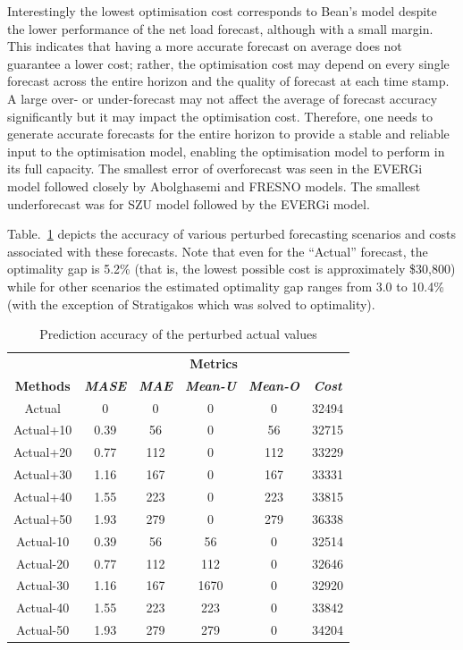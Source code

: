 \documentclass[conference]{IEEEtran}
\begin{document}
Interestingly the lowest optimisation cost corresponds to Bean's model despite the lower performance of the net load forecast, although with a small margin. This indicates that having a more accurate forecast on average does not guarantee a lower cost; rather, the optimisation cost may depend on every single forecast across the entire horizon and the quality of forecast at each time stamp. A large over- or under-forecast may not affect the average of forecast accuracy significantly but it may impact the optimisation cost. Therefore, one needs to generate accurate forecasts for the entire horizon to provide a stable and reliable input to the optimisation model, enabling the optimisation model to perform in its full capacity. The smallest error of overforecast was seen in the EVERGi model followed closely by Abolghasemi and FRESNO models. The smallest underforecast was for SZU model followed by the EVERGi model. 


Table.~\ref{tab:accPurt} depicts the accuracy of various perturbed forecasting scenarios and costs associated with these forecasts. Note that even for the ``Actual'' forecast, the optimality gap is 5.2\% (that is, the lowest possible cost is approximately \$30,800) while for other scenarios the estimated optimality gap ranges from 3.0 to 10.4\% (with the exception of Stratigakos which was solved to optimality).

\begin{table}[htbp]
\caption{Prediction accuracy of the perturbed actual values}
\begin{center}
\begin{tabular}{|c|c|c|c|c|c|}
\hline
\textbf{}&\multicolumn{5}{|c|}{\textbf{Metrics}} \\
\cline{2-6} 
\textbf{Methods} & \textbf{\textit{MASE}}& \textbf{\textit{MAE}}& \textbf{\textit{Mean-U}}& \textbf{\textit{Mean-O}}& \textbf{\textit{Cost}} \\
\hline
Actual & 0 & 0 & 0 & 0& 32494\\
Actual+10 & 0.39 & 56 & 0& 56  &32715 \\
Actual+20 & 0.77 &112 & 0& 112 &33229\\
Actual+30 & 1.16 &167  & 0& 167  &33331  \\
Actual+40 & 1.55 &223 & 0& 223  &33815 \\
Actual+50 & 1.93 & 279& 0 & 279 &36338  \\ %
Actual-10 & 0.39 & 56 & 56& 0 &32514 \\
Actual-20 & 0.77 &112 & 112& 0 &32646 \\
Actual-30 & 1.16 &167 & 1670& 0 &32920 \\
Actual-40 & 1.55 &223 & 223& 0 & 33842\\
Actual-50 & 1.93 & 279& 279 & 0 &34204 \\
\hline
\end{tabular}
\label{tab:accPurt}
\end{center}
\end{table}
\end{document}
